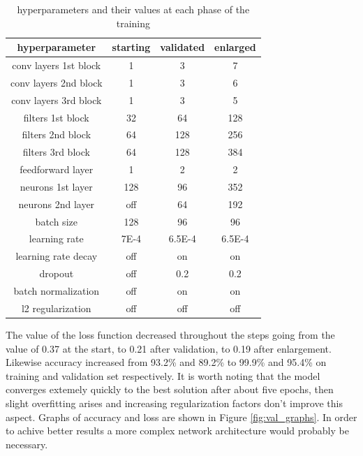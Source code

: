\documentclass[12pt]{article}
\begin{document}
\begin{table}
	\centering
	\begin{tabular}{|c|c|c|c|} 
		\hline
		\textbf{hyperparameter} & \textbf{starting} & \textbf{validated} & \textbf{enlarged}\\
		\hline
		conv layers 1st block & 1 & 3 & 7\\
		conv layers 2nd block & 1 & 3 & 6\\ 
		conv layers 3rd block & 1 & 3 & 5\\ 
		filters 1st block & 32 & 64 & 128\\
		filters 2nd block & 64 & 128 & 256\\
		filters 3rd block & 64 & 128 & 384\\ 
		feedforward layer & 1 & 2 & 2\\
		neurons 1st layer & 128 & 96 & 352\\
		neurons 2nd layer & off & 64 & 192\\
		batch size & 128 & 96 & 96\\
		learning rate & 7E-4 & 6.5E-4 & 6.5E-4\\
		learning rate decay & off & on & on\\
		dropout & off & 0.2 & 0.2\\
		batch normalization & off & on & on\\
		l2 regularization & off & off & off\\
		\hline
	\end{tabular}
	\caption{hyperparameters and their values at each phase of the training}
	\label{tab:def-hyper}
\end{table}

The value of the loss function decreased throughout the steps going from the value of 0.37 at the start, to 0.21 after validation, to 0.19 after enlargement. Likewise accuracy increased from 93.2\% and 89.2\% to 99.9\% and 95.4\% on training and validation set respectively. It is worth noting that the model converges extemely quickly to the best solution after about five epochs, then slight overfitting arises and increasing regularization factors don't improve this aspect. Graphs of accuracy and loss are shown in Figure \ref{fig:val_graphs}. In order to achive better results a more complex network architecture would probably be necessary.
\end{document}

